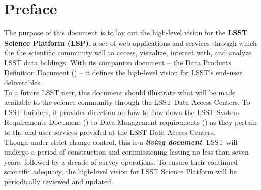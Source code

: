 \maketitle

\section{Preface\label{sec:preface}}

The purpose of this document is to lay out the high-level vision for the \textbf{LSST Science Platform (LSP)}, a set of web applications and services through which the the scientific community will to access, visualize, interact with, and analyze LSST data holdings. With its companion document -- the Data Products Definition Document (\DPDD) -- it defines the high-level vision for LSST's end-user deliverables.
\\

To a future LSST user, this document should illustrate what will be made available to the science community through the LSST Data Access Centers. To LSST builders, it provides direction on how to flow down the LSST System Requirements Document (\LSR) to Data Management requirements (\DMSR) as they pertain to the end-user services provided at the LSST Data Access Centers.
\\

Though under strict change control, this is a \textbf\emph{living document}. LSST will undergo a period of construction  and commissioning lasting no less than seven years, followed by a decade of survey operations. To ensure their continued scientific adequacy, the high-level vision for LSST Science Platform will be periodically reviewed and updated.
